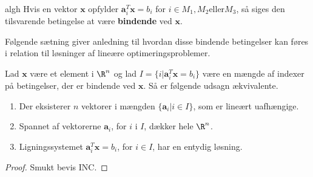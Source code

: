 \begin{defn}{}{algh}
Hvis en vektor $\textbf{x}$ opfylder $\textbf{a}^T_i\textbf{x}= b_i$ for $i \in M_1, M_2 \text{eller} M_3$, så siges den tilsvarende betingelse at være \textbf{bindende} ved $\textbf{x}$.
\end{defn}\noindent
%
Følgende sætning giver anledning til hvordan disse bindende betingelser kan føres i relation til løsninger af lineære optimeringsproblemer.
%
\begin{thm}{}{}

Lad $\textbf{x}$ være et element i $\R^n$ og lad $I=\{i|\textbf{a}^T_i\textbf{x}=b_i\}$ være en mængde af indexer på betingelser, der er bindende ved $\textbf{x}$.
Så er følgende udsagn ækvivalente.
%
\begin{enumerate}[label=(\alph*)]
\item Der eksisterer $n$ vektorer i mængden $\{\textbf{a}_i|i \in I \}$, som er lineært uafhængige.
\item Spannet af vektorerne $\textbf{a}_i$, for $i$ i $I$, dækker hele $\R^n$.
\item Ligningssystemet $\textbf{a}^T_i\textbf{x}= b_i$, for $i \in I$, har en entydig løsning.
\end{enumerate}
\end{thm}
%
\begin{proof}
Smukt bevis INC.
\end{proof}